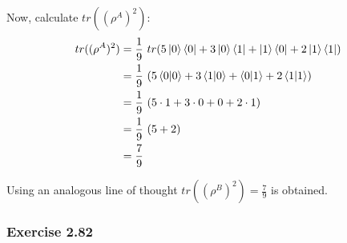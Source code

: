 Now, calculate $tr((\rho^A)^2)$:
\begin{align}
    tr((\rho^A)^2) &= \frac{1}{9}\ tr(5\ket{0}\bra{0} + 3\ket{0}\bra{1} +
        \ket{1}\bra{0} + 2\ket{1}\bra{1}) \\
    &= \frac{1}{9}\ (5\braket{0|0} + 3\braket{1|0} +
        \braket{0|1} + 2\braket{1|1}) \\
    &= \frac{1}{9}\ (5 \cdot 1 + 3 \cdot 0 + 0 + 2 \cdot 1) \\
    &= \frac{1}{9}\ (5 + 2) \\
    &= \frac{7}{9}
\end{align}

Using an analogous line of thought $tr((\rho^B)^2) = \frac{7}{9}$ is obtained.

\subsubsection{Exercise 2.82}


